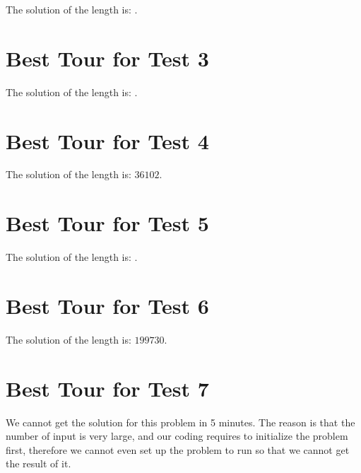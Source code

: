 \documentclass[11pt]{scrreprt}
\begin{document}
The solution of the length is: $ $.


\section{Best Tour for Test 3}

The solution of the length is: $ $.


\section{Best Tour for Test 4}

The solution of the length is: $36102$.


\section{Best Tour for Test 5}

The solution of the length is: $ $.


\section{Best Tour for Test 6}

The solution of the length is: $199730$.


\section{Best Tour for Test 7}

We cannot get the solution for this problem in 5 minutes. The reason is that the number of input is very large, and our coding requires to initialize the problem first, therefore we cannot even set up the problem to run so that we cannot get the result of it.
\end{document}
